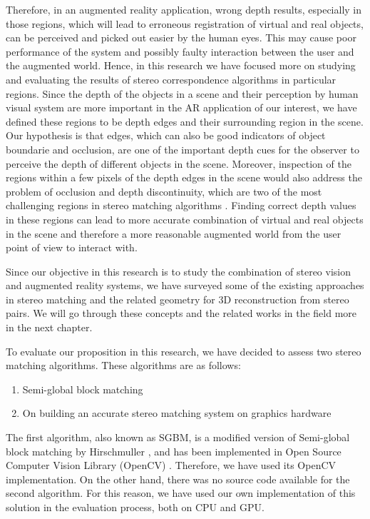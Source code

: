 \documentclass[dvips,letterpaper,12pt]{report}
\begin{document}
Therefore, in an augmented reality application, wrong depth results, especially in those regions, which will lead to erroneous registration of virtual and real objects, 
can be perceived and picked out easier by the human eyes. This may cause poor performance of the system and possibly faulty interaction between 
the user and the augmented world. 
Hence, in this research we have focused more on studying and evaluating the results of stereo correspondence algorithms in particular regions. Since the depth of the objects 
in a scene and their perception by human visual system are more important in the AR application of our interest, we have 
defined these regions to be depth edges and their surrounding region in the scene.
Our hypothesis is that edges, which can also be good indicators of object boundarie and occlusion, are one of the important depth cues for the observer 
to perceive the depth of different objects in the scene. 
Moreover, inspection of the regions within a few pixels of the depth edges in the scene would also address the problem of occlusion and depth discontinuity, which are two of
the most challenging regions in stereo matching algorithms \cite{sch02}.
Finding correct depth values in these 
regions can lead to more accurate combination of virtual and real objects in the scene and therefore a more reasonable augmented world from the user point of view to interact with. \newline
\newline

Since our objective in this research is to study the combination of stereo vision and augmented reality systems, we have surveyed some of the existing approaches in stereo matching and the
related geometry for 3D reconstruction from stereo pairs. We will go through these concepts and the related works in the field more in the next chapter. 

To evaluate our proposition in this research, we have decided to assess two stereo matching algorithms. These algorithms are as follows:
\begin{enumerate}
\item Semi-global block matching
\item On building an accurate stereo matching system on graphics hardware \cite{mei11}
\end{enumerate}

The first algorithm, also known as SGBM, is a modified version of Semi-global block matching by Hirschmuller \cite{hir08}, 
and has been implemented in Open Source Computer Vision Library (OpenCV) \cite{sgbm}. Therefore, we have used its OpenCV implementation. 
On the other hand, there was no source code available for the second algorithm. For this reason, we have used our own implementation of this solution in the evaluation process, both on CPU and GPU.
\end{document}
